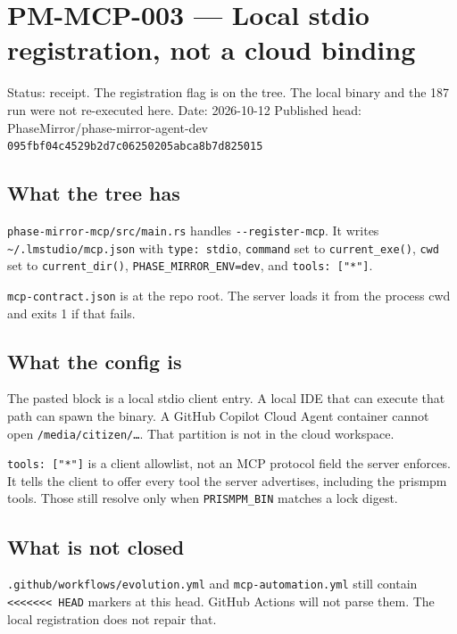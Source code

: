 \documentclass[
]{article}
\author{}
\date{}
\begin{document}
\hypertarget{pm-mcp-003-local-stdio-registration-not-a-cloud-binding}{%
\section{PM-MCP-003 --- Local stdio registration, not a cloud
binding}\label{pm-mcp-003-local-stdio-registration-not-a-cloud-binding}}

Status: receipt. The registration flag is on the tree. The local binary
and the 187 run were not re-executed here. Date: 2026-10-12 Published
head: PhaseMirror/phase-mirror-agent-dev
\texttt{095fbf04c4529b2d7c06250205abca8b7d825015}

\hypertarget{what-the-tree-has}{%
\subsection{What the tree has}\label{what-the-tree-has}}

\texttt{phase-mirror-mcp/src/main.rs} handles \texttt{-\/-register-mcp}.
It writes \texttt{\textasciitilde{}/.lmstudio/mcp.json} with
\texttt{type:\ stdio}, \texttt{command} set to \texttt{current\_exe()},
\texttt{cwd} set to \texttt{current\_dir()},
\texttt{PHASE\_MIRROR\_ENV=dev}, and \texttt{tools:\ {[}"*"{]}}.

\texttt{mcp-contract.json} is at the repo root. The server loads it from
the process cwd and exits 1 if that fails.

\hypertarget{what-the-config-is}{%
\subsection{What the config is}\label{what-the-config-is}}

The pasted block is a local stdio client entry. A local IDE that can
execute that path can spawn the binary. A GitHub Copilot Cloud Agent
container cannot open \texttt{/media/citizen/…}. That partition is not
in the cloud workspace.

\texttt{tools:\ {[}"*"{]}} is a client allowlist, not an MCP protocol
field the server enforces. It tells the client to offer every tool the
server advertises, including the prismpm tools. Those still resolve only
when \texttt{PRISMPM\_BIN} matches a lock digest.

\hypertarget{what-is-not-closed}{%
\subsection{What is not closed}\label{what-is-not-closed}}

\texttt{.github/workflows/evolution.yml} and \texttt{mcp-automation.yml}
still contain
\texttt{\textless{}\textless{}\textless{}\textless{}\textless{}\textless{}\textless{}\ HEAD}
markers at this head. GitHub Actions will not parse them. The local
registration does not repair that.
\end{document}
